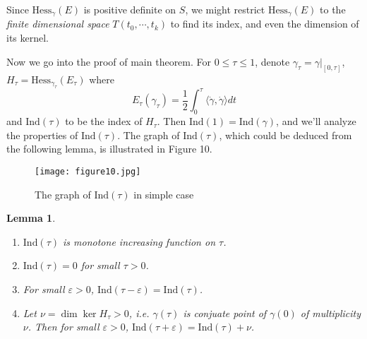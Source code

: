 \documentclass{article}
\newtheorem{lemma}[theorem]{Lemma}
\newcommand{\ep}{\varepsilon}
\newcommand{\il}{\langle}
\newcommand{\ir}{\rangle}
\newcommand{\g}{\gamma}
\newcommand{\Hess}{\mathrm{Hess}}
\newcommand{\Ind}{\mathrm{Ind}}
\begin{document}
Since $\Hess_\g(E)$ is positive definite on $S$, we might restrict $\Hess_\g(E)$ to the \emph{finite dimensional space} $T(t_0,\cdots,t_k)$ to find its index, and even the dimension of its kernel.

Now we go into the proof of main theorem.
For $0\leq \tau\leq 1$, denote $\g_\tau=\g|_{[0,\tau]}$, $H_\tau=\Hess_{\g_{\tau}}(E_\tau)$ where
	$$E_\tau(\g_\tau)=\frac{1}{2}\int_0^\tau \il\dot{\g},\dot{\g}\ir dt$$
and $\Ind(\tau)$ to be the index of $H_\tau$.
Then $\Ind(1)=\Ind(\g)$, and we'll analyze the properties of $\Ind(\tau)$.
The graph of $\Ind(\tau)$, which could be deduced from the following lemma, is illustrated in Figure 10.


\begin{figure}[h]
		\centering
		\texttt{[image: figure10.jpg]}
		\caption{The graph of $\Ind(\tau)$ in simple case}
\end{figure}

	\begin{lemma}\rm
	\begin{enumerate}
	\item $\Ind(\tau)$ is monotone increasing function on $\tau$.
	\item $\Ind(\tau)=0$ for small $\tau>0$.
	\item For small $\ep>0$, $\Ind(\tau-\ep)=\Ind(\tau)$.
	\item Let $\nu=\dim\ker H_\tau>0$, i.e. $\g(\tau)$ is conjuate point of $\g(0)$ of multiplicity $\nu$.
	Then for small $\ep>0$, $\Ind(\tau+\ep)=\Ind(\tau)+\nu$.
	\end{enumerate}
	\end{lemma}
\end{document}
